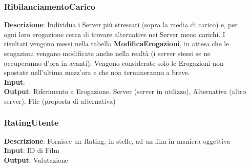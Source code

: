 \documentclass{article}
\begin{document}
\subsubsection{RibilanciamentoCarico}
\textbf{Descrizione}: Individua i Server più stressati (sopra la media di carico) e, per ogni loro erogazione cerca di trovare alternative nei Server meno carichi. I risultati vengono messi nella tabella \textbf{ModificaErogazioni}, in attesa che le erogazioni vengano modificate anche nella realtà (i server stessi se ne occuperanno d'ora in avanti). Vengono considerate solo le Erogazioni non spostate nell'ultima mezz'ora e che non termineranno a breve. \\
\textbf{Input}: \\
\textbf{Output}: Riferimento a Erogazione, Server (server in utilizzo), Alternativa (altro server), File (proposta di alternativa) \\
\subsubsection{RatingUtente}
\textbf{Descrizione}: Fornisce un Rating, in stelle, ad un film in maniera oggettiva \\
\textbf{Input}:  ID di Film \\
\textbf{Output}: Valutazione \\
\newpage
\printbibliography
\end{document}
